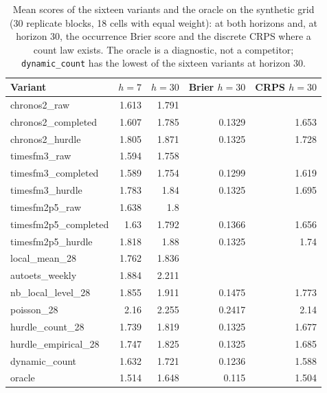 \begin{table}[htbp]
\centering\footnotesize\setlength{\tabcolsep}{3.5pt}
\caption{Mean scores of the sixteen variants and the oracle on the synthetic grid (30 replicate blocks,
18 cells with equal weight): \qs{} at both horizons and, at horizon 30, the occurrence Brier score and the
discrete CRPS where a count law exists. The oracle is a diagnostic, not a competitor;
\texttt{dynamic\_count} has the lowest \qs{} of the sixteen variants at horizon 30.}
\label{tab:s2synscores}
\begin{tabular}{lrrrr}
\toprule
Variant & \qs{} $h = 7$ & \qs{} $h = 30$ & Brier $h = 30$ & CRPS $h = 30$ \\
\midrule
chronos2\_raw & 1.613 & 1.791 &  &  \\
chronos2\_completed & 1.607 & 1.785 & 0.1329 & 1.653 \\
chronos2\_hurdle & 1.805 & 1.871 & 0.1325 & 1.728 \\
timesfm3\_raw & 1.594 & 1.758 &  &  \\
timesfm3\_completed & 1.589 & 1.754 & 0.1299 & 1.619 \\
timesfm3\_hurdle & 1.783 & 1.84 & 0.1325 & 1.695 \\
timesfm2p5\_raw & 1.638 & 1.8 &  &  \\
timesfm2p5\_completed & 1.63 & 1.792 & 0.1366 & 1.656 \\
timesfm2p5\_hurdle & 1.818 & 1.88 & 0.1325 & 1.74 \\
local\_mean\_28 & 1.762 & 1.836 &  &  \\
autoets\_weekly & 1.884 & 2.211 &  &  \\
nb\_local\_level\_28 & 1.855 & 1.911 & 0.1475 & 1.773 \\
poisson\_28 & 2.16 & 2.255 & 0.2417 & 2.14 \\
hurdle\_count\_28 & 1.739 & 1.819 & 0.1325 & 1.677 \\
hurdle\_empirical\_28 & 1.747 & 1.825 & 0.1325 & 1.685 \\
dynamic\_count & 1.632 & 1.721 & 0.1236 & 1.588 \\
oracle & 1.514 & 1.648 & 0.115 & 1.504 \\
\bottomrule
\end{tabular}
\end{table}

